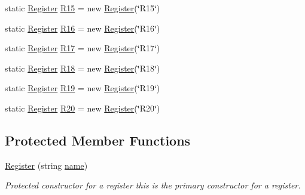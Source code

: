\begin{DoxyCompactItemize}
\item 
static \hyperlink{class_c_p_u___o_s___simulator_1_1_c_p_u_1_1_register}{Register} \hyperlink{class_c_p_u___o_s___simulator_1_1_c_p_u_1_1_register_a643aa109f6aea2e44a92aca9cd62b2df}{R15} = new \hyperlink{class_c_p_u___o_s___simulator_1_1_c_p_u_1_1_register}{Register}(\char`\"{}R15\char`\"{})
\item 
static \hyperlink{class_c_p_u___o_s___simulator_1_1_c_p_u_1_1_register}{Register} \hyperlink{class_c_p_u___o_s___simulator_1_1_c_p_u_1_1_register_ac008605898ab29a4ecd071f25f9e2d50}{R16} = new \hyperlink{class_c_p_u___o_s___simulator_1_1_c_p_u_1_1_register}{Register}(\char`\"{}R16\char`\"{})
\item 
static \hyperlink{class_c_p_u___o_s___simulator_1_1_c_p_u_1_1_register}{Register} \hyperlink{class_c_p_u___o_s___simulator_1_1_c_p_u_1_1_register_add014a0021f9e8115728d7b95a398bda}{R17} = new \hyperlink{class_c_p_u___o_s___simulator_1_1_c_p_u_1_1_register}{Register}(\char`\"{}R17\char`\"{})
\item 
static \hyperlink{class_c_p_u___o_s___simulator_1_1_c_p_u_1_1_register}{Register} \hyperlink{class_c_p_u___o_s___simulator_1_1_c_p_u_1_1_register_aac05b1dce0cbfda874ca7c1783485095}{R18} = new \hyperlink{class_c_p_u___o_s___simulator_1_1_c_p_u_1_1_register}{Register}(\char`\"{}R18\char`\"{})
\item 
static \hyperlink{class_c_p_u___o_s___simulator_1_1_c_p_u_1_1_register}{Register} \hyperlink{class_c_p_u___o_s___simulator_1_1_c_p_u_1_1_register_a1d5394eb0e63d28e96decccbdbc2ec2c}{R19} = new \hyperlink{class_c_p_u___o_s___simulator_1_1_c_p_u_1_1_register}{Register}(\char`\"{}R19\char`\"{})
\item 
static \hyperlink{class_c_p_u___o_s___simulator_1_1_c_p_u_1_1_register}{Register} \hyperlink{class_c_p_u___o_s___simulator_1_1_c_p_u_1_1_register_a6fe52ef881281bbfdc42aa7f4cc68f4d}{R20} = new \hyperlink{class_c_p_u___o_s___simulator_1_1_c_p_u_1_1_register}{Register}(\char`\"{}R20\char`\"{})
\end{DoxyCompactItemize}
\subsection*{Protected Member Functions}
\begin{DoxyCompactItemize}
\item 
\hyperlink{class_c_p_u___o_s___simulator_1_1_c_p_u_1_1_register_a17e76aef3bd00389ac1473b4edda8855}{Register} (string \hyperlink{class_c_p_u___o_s___simulator_1_1_c_p_u_1_1_register_a1d9405f19dc212f0ff3d3307469451db}{name})
\begin{DoxyCompactList}\small\item\em Protected constructor for a register this is the primary constructor for a register. \end{DoxyCompactList}\end{DoxyCompactItemize}
